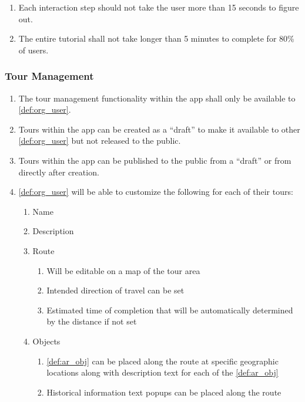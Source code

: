 \documentclass{article}
\begin{document}
\begin{enumerate}[align=left, label=\textbf{TU-NFR\arabic*:}]
    \item Each interaction step should not take the user more than 15 seconds to figure out.
    \item The entire tutorial shall not take longer than 5 minutes to complete for 80\% of users.
\end{enumerate}

\subsubsection{Tour Management}
\label{ssub:tour_management}

\begin{enumerate}[align=left, label=\textbf{TM-FR\arabic*:}]
    \item The tour management functionality within the app shall only be available to \ref{def:org_user}.
    \item Tours within the app can be created as a “draft” to make it available to other \ref{def:org_user} but not released to the public.
    \item Tours within the app can be published to the public from a “draft” or from directly after creation.
    \item \ref{def:org_user} will be able to customize the following for each of their tours:
    \begin{enumerate}
        \item Name
        \item Description
        \item Route
        \begin{enumerate}
            \item Will be editable on a map of the tour area
            \item Intended direction of travel can be set
            \item Estimated time of completion that will be automatically determined by the distance if not set
        \end{enumerate}
        \item Objects
        \begin{enumerate}
            \item \ref{def:ar_obj} can be placed along the route at specific geographic locations along with description text for each of the \ref{def:ar_obj}
            \item Historical information text popups can be placed along the route

\end{enumerate}
\end{enumerate}
\end{enumerate}
\end{document}
